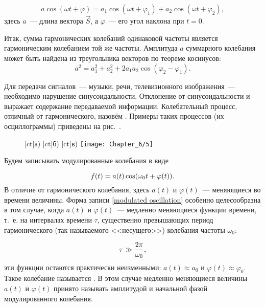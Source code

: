 \begin{equation*}
	a\cos(\omega t + \varphi)=a_1\cos(\omega t+\varphi_1)+a_2\cos(\omega t + \varphi_2),
\end{equation*}
здесь $a$~--- длина вектора $\vec{S}$, а $\varphi$~--- его угол наклона при $t = 0$.

Итак, сумма гармонических колебаний одинаковой частоты является гармоническим колебанием той же частоты. Амплитуда $a$
суммарного колебания может быть найдена из треугольника векторов по теореме косинусов:
\begin{equation*}
	a^2=a_1^2+a_2^2+2a_1a_2\cos(\varphi_2-\varphi_1).
\end{equation*}


Для передачи сигналов~--- музыки, речи, телевизионного изображения~--- необходимо нарушение синусоидальности. Отклонение
от синусоидальности и выражает содержание передаваемой информации. Колебательный процесс, отличный от гармонического,
назовём . Примеры таких процессов (их осциллограммы) приведены на рис.~.

\begin{figure}[h!]
	[ct]{а)}
	[ct]{б)}
	[ct]{в)}
	\texttt{[image: Chapter\_6/5]}
	\caption{}
\end{figure}

Будем записывать модулированные колебания в виде

\begin{equation}
	\eqmark{modulated oscillation}
	f(t)=a(t)\cos(\omega_0t+\varphi(t)).
\end{equation}
В отличие от гармонического колебания, здесь $a(t)$ и $\varphi(t)$~--- меняющиеся во времени величины. Форма записи \eqref{modulated oscillation}
особенно целесообразна в том случае, когда $a(t)$ и $\varphi(t)$~--- медленно меняющиеся функции времени, т.~е. на
интервалах времени $\tau$, существенно превышающих период гармонического (так называемого <<несущего>>) колебания
частоты $\omega_0$:

\begin{equation}
	\eqmark{quasiharmonic oscillation - tau}
	\tau \gg \frac{2\pi}{\omega_0},
\end{equation}
эти функции остаются практически неизменными: $a(t)\approx a_{0}$ и $\varphi(t)\approx\varphi_0$. Такое колебание называется
. В этом случае медленно меняющиеся величины $a(t)$ и $\varphi(t)$ принято называть амплитудой и
начальной фазой модулированного колебания.

